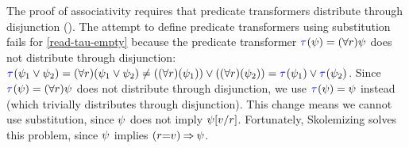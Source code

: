 The proof of associativity requires that predicate
transformers distribute through disjunction ().  The
attempt to define predicate transformers using substitution fails for
\ref{read-tau-empty} because the predicate transformer
$\aTr{}{\bForm}=(\forall\aReg)\bForm$ does not distribute through
disjunction:
\begin{math}
  \aTr{}{\bForm_1\lor \bForm_2}=
  (\forall r)(\bForm_1\lor \bForm_2)
  \neq
  ((\forall r)(\bForm_1)) \lor ((\forall r)(\bForm_2))
  = \aTr{}{\bForm_1} \lor \aTr{}{\bForm_2}
\end{math}.  Since $\aTr{}\bForm=(\forall\aReg)\bForm$ does not distribute
through disjunction, we use $\aTr{}\bForm=\bForm$ instead (which trivially
distributes through disjunction).  This change means we cannot use
substitution, since $\psi$ does not imply $\psi[v/r]$.
Fortunately, Skolemizing solves this problem, since $\psi$ implies
$(r{=}v)\mathbin{\Rightarrow}\psi$.


\label{sec:ex:last}
